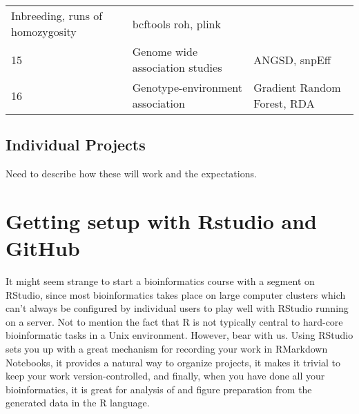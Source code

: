 \documentclass[]{book}
\begin{document}
\begin{longtable}[]{@{}lll@{}}
\begin{minipage}[t]{0.46\columnwidth}
Inbreeding, runs of homozygosity\strut
\end{minipage} & \begin{minipage}[t]{0.33\columnwidth}\raggedright
bcftools roh, plink\strut
\end{minipage}\tabularnewline
\begin{minipage}[t]{0.13\columnwidth}\raggedright
15\strut
\end{minipage} & \begin{minipage}[t]{0.46\columnwidth}\raggedright
Genome wide association studies\strut
\end{minipage} & \begin{minipage}[t]{0.33\columnwidth}\raggedright
ANGSD, snpEff\strut
\end{minipage}\tabularnewline
\begin{minipage}[t]{0.13\columnwidth}\raggedright
16\strut
\end{minipage} & \begin{minipage}[t]{0.46\columnwidth}\raggedright
Genotype-environment association\strut
\end{minipage} & \begin{minipage}[t]{0.33\columnwidth}\raggedright
Gradient Random Forest, RDA\strut
\end{minipage}\tabularnewline
\bottomrule
\end{longtable}

\hypertarget{indproj}{%
\section*{Individual Projects}\label{indproj}}

Need to describe how these will work and the expectations.

\hypertarget{getting-setup-with-rstudio-and-github}{%
\chapter{Getting setup with Rstudio and GitHub}\label{getting-setup-with-rstudio-and-github}}

It might seem strange to start a bioinformatics course with a segment
on RStudio, since most bioinformatics takes place on large computer
clusters which can't always be configured by individual users to
play well with RStudio running on a server. Not to mention the fact that
R is not typically central to hard-core bioinformatic tasks in a
Unix environment. However, bear with us. Using RStudio sets you up
with a great mechanism for recording your work in RMarkdown Notebooks,
it provides a natural way to organize projects, it makes it trivial
to keep your work version-controlled, and finally, when you have done
all your bioinformatics, it is great for analysis of and figure preparation from
the generated data in the R language.
\end{document}

